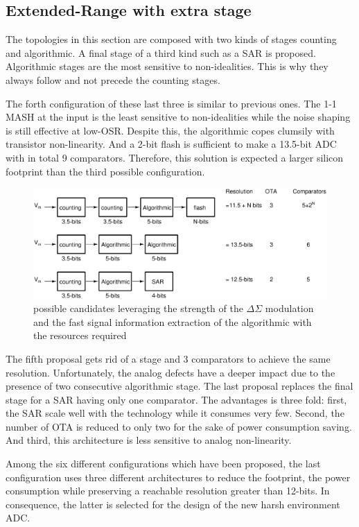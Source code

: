 \subsection{Extended-Range with extra stage}
The topologies in this section are composed with two kinds of stages counting and algorithmic. A final stage of a third kind such as a SAR is proposed. Algorithmic stages are the most sensitive to non-idealities. This is why they always follow and not precede the counting stages.

The forth configuration of these last three is similar to previous ones. The 1-1 MASH at the input is the least sensitive to non-idealities while the noise shaping is still effective at low-OSR\@. Despite this, the algorithmic copes clumsily with transistor non-linearity. And a 2-bit flash is sufficient to make a 13.5-bit ADC with in total 9 comparators. Therefore, this solution is expected a larger silicon footprint than the third possible configuration.

\begin{figure}[htp]
	\centering
	\includegraphics[width=.9\textwidth]{Chapter4/Figs/study/counting-algo-conversion.ps}
	\caption{possible candidates leveraging the strength of the \(\Delta \Sigma\) modulation and the fast signal information extraction of the algorithmic with the resources required }
	\label{fig:counting-algo-candidates}
\end{figure}

The fifth proposal gets rid of a stage and 3 comparators to achieve the same resolution. Unfortunately, the analog defects have a deeper impact due to the presence of two consecutive algorithmic stage. The last proposal replaces the final stage for a SAR having only one comparator. The advantages is three fold: first, the SAR scale well with the technology while it consumes very few. Second, the number of OTA is reduced to only two for the sake of power consumption saving. And third, this architecture is less sensitive to analog non-linearity.

Among the six different configurations which have been proposed, the last configuration uses three different architectures to reduce the footprint, the power consumption while preserving a reachable resolution greater than 12-bits. In consequence, the latter is selected for the design of the new harsh environment ADC\@.

